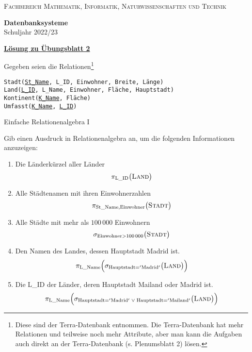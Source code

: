 \documentclass[12pt,a4paper,notitlepage,leqno]{article}
\begin{document}
\vspace{0.2cm}
\begin{minipage}[c]{0.5\textwidth}
\begin{center}
\textsc{Fachbereich Mathematik, Informatik, Naturwissenschaften und Technik}
\end{center}
\end{minipage}
\begin{minipage}[c]{0.5\textwidth}
\begin{center}
\textbf{Datenbanksysteme}\\
Schuljahr 2022/23
\end{center}
\end{minipage}

\begin{center}
\textbf{\underline{Lösung zu Übungsblatt 2}}

\vspace{0.2cm}
\end{center}

Gegeben seien die Relationen\footnote{Diese sind der Terra-Datenbank entnommen. Die Terra-Datenbank hat mehr Relationen und teilweise noch mehr Attribute, aber man kann die Aufgaben auch direkt an der Terra-Datenbank (s. Plenumsblatt 2) lösen.}

\begin{center}
    \texttt{Stadt(\underline{St\_Name}, L\_ID, Einwohner, Breite, Länge)}\\
    \texttt{Land(\underline{L\_ID}, L\_Name, Einwohner, Fläche, Hauptstadt)}\\
    \texttt{Kontinent(\underline{K\_Name}, Fläche)}\\
    \texttt{Umfasst(\underline{K\_Name}, \underline{L\_ID})}
\end{center}

\begin{aufgabe}{Einfache Relationenalgebra I}

Gib einen Ausdruck in Relationenalgebra an, um die folgenden Informationen anzuzeigen:

\begin{enumerate}
    \item Die Länderkürzel aller Länder
    \[
        \pi_{\mathrm{L\_ID}}\bigl(\textsc{Land}\bigr)
    \]
    \item Alle Städtenamen mit ihren Einwohnerzahlen
    \[
        \pi_{\mathrm{St\_Name, Einwohner}}\bigl(\textsc{Stadt}\bigr)
    \]
    \item Alle Städte mit mehr als $100\,000$ Einwohnern
    \[
        \sigma_{\mathrm{Einwohner} > 100\,000}\bigl(\textsc{Stadt}\bigr)
    \]
    \item Den Namen des Landes, dessen Hauptstadt Madrid ist.
    \[
        \pi_{\mathrm{L\_Name}}\Bigl(\sigma_{\mathrm{Hauptstadt='Madrid'}}\bigl(\textsc{Land}\bigr)\Bigr)
    \]
    \item Die L\_ID der Länder, deren Hauptstadt Mailand oder Madrid ist.
    \[
        \pi_{\mathrm{L\_Name}}\Bigl(\sigma_{\mathrm{Hauptstadt='Madrid'}\;\lor\; \mathrm{Hauptstadt='Mailand'}}\bigl(\textsc{Land}\bigr)\Bigr)
    \]
    
\end{enumerate}

\end{aufgabe}
\end{document}
